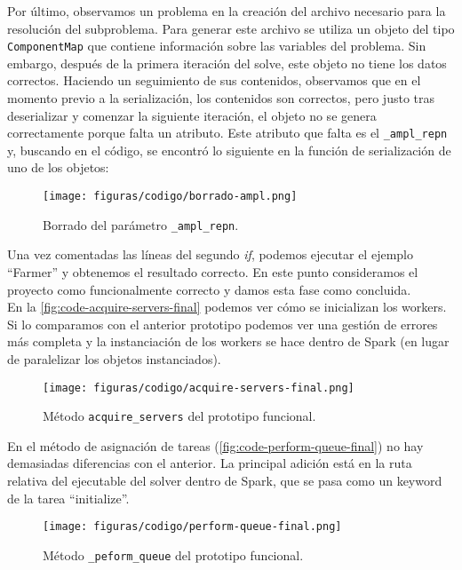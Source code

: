 Por último, observamos un problema en la creación del archivo necesario para la resolución del subproblema. Para generar este archivo se utiliza un objeto del tipo \texttt{ComponentMap} que contiene información sobre las variables del problema. Sin embargo, después de la primera iteración del solve, este objeto no tiene los datos correctos. Haciendo un seguimiento de sus contenidos, observamos que en el momento previo a la serialización, los contenidos son correctos, pero justo tras deserializar y comenzar la siguiente iteración, el objeto no se genera correctamente porque falta un atributo. Este atributo que falta es el \texttt{\_ampl\_repn} y, buscando en el código, se encontró lo siguiente en la función de serialización de uno de los objetos:

\begin{figure}[H]
    \centerline{\texttt{[image: figuras/codigo/borrado-ampl.png]}}
    \caption{Borrado del parámetro \texttt{\_ampl\_repn}.}
    \label{fig:ampl-repn-deletion}
\end{figure}

Una vez comentadas las líneas del segundo \textit{if}, podemos ejecutar el ejemplo ``Farmer'' y obtenemos el resultado correcto. En este punto consideramos el proyecto como funcionalmente correcto y damos esta fase como concluida.\\

En la \autoref{fig:code-acquire-servers-final} podemos ver cómo se inicializan los workers. Si lo comparamos con el anterior prototipo podemos ver una gestión de errores más completa y la instanciación de los workers se hace dentro de Spark (en lugar de paralelizar los objetos instanciados).\\

\begin{figure}[H]
    \centerline{\texttt{[image: figuras/codigo/acquire-servers-final.png]}}
    \caption{Método \texttt{acquire\_servers} del prototipo funcional.}
    \label{fig:code-acquire-servers-final}
\end{figure}

En el método de asignación de tareas (\autoref{fig:code-perform-queue-final}) no hay demasiadas diferencias con el anterior. La principal adición está en la ruta relativa del ejecutable del solver dentro de Spark, que se pasa como un keyword de la tarea ``initialize''.\\

\begin{figure}[H]
    \centerline{\texttt{[image: figuras/codigo/perform-queue-final.png]}}
    \caption{Método \texttt{\_peform\_queue} del prototipo funcional.}
    \label{fig:code-perform-queue-final}
\end{figure}

